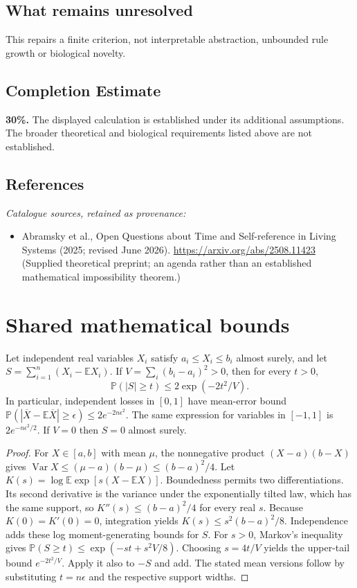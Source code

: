 \documentclass[11pt]{article}
\begin{document}
\subsection{What remains unresolved}
This repairs a finite criterion, not interpretable abstraction, unbounded rule growth or biological novelty.
\subsection{Completion Estimate}
\textbf{30\%.} The displayed calculation is established under its additional assumptions. The broader theoretical and biological requirements listed above are not established.
\subsection{References}
\noindent\emph{Catalogue sources, retained as provenance:}
\begin{itemize}
\item Abramsky et al., Open Questions about Time and Self-reference in Living Systems (2025; revised June 2026). \url{https://arxiv.org/abs/2508.11423} (Supplied theoretical preprint; an agenda rather than an established mathematical impossibility theorem.)
\end{itemize}




\section{Shared mathematical bounds}\label{app:bounds}
\begin{lemma}\label{lem:bounded}
Let independent real variables $X_i$ satisfy $a_i\leq X_i\leq b_i$ almost surely,
and let $S=\sum_{i=1}^n(X_i-\mathbb{E} X_i)$. If
$V=\sum_i(b_i-a_i)^2>0$, then for every $t>0$,
\[
 \mathbb{P}(|S|\geq t)\leq 2\exp(-2t^2/V).
\]
In particular, independent losses in $[0,1]$ have mean-error bound
$\mathbb{P}(|\overline X-\mathbb{E}\overline X|\geq\epsilon)
\leq2e^{-2n\epsilon^2}$. The same expression for variables in $[-1,1]$
is $2e^{-n\epsilon^2/2}$. If $V=0$ then $S=0$ almost surely.
\end{lemma}
\begin{proof}
For $X\in[a,b]$ with mean $\mu$, the nonnegative product
$(X-a)(b-X)$ gives
$\operatorname{Var} X\leq(\mu-a)(b-\mu)\leq(b-a)^2/4$.
Let $K(s)=\log\mathbb{E}\exp[s(X-\mathbb{E} X)]$.
Boundedness permits two differentiations. Its second derivative is the variance
under the exponentially tilted law, which has the same support, so
$K''(s)\leq(b-a)^2/4$ for every real $s$.
Because $K(0)=K'(0)=0$, integration yields
$K(s)\leq s^2(b-a)^2/8$.
Independence adds these log moment-generating bounds for $S$.
For $s>0$, Markov's inequality gives
$\mathbb{P}(S\geq t)\leq\exp(-st+s^2V/8)$.
Choosing $s=4t/V$ yields the upper-tail bound $e^{-2t^2/V}$.
Apply it also to $-S$ and add. The stated mean versions follow by substituting
$t=n\epsilon$ and the respective support widths.
\end{proof}
\end{document}
